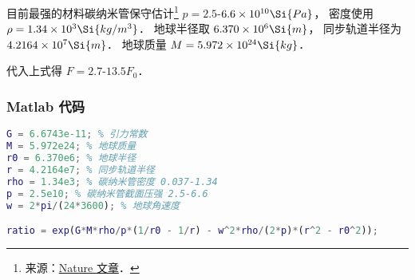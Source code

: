 目前最强的材料碳纳米管保守估计\footnote{来源：\href{https://www.nature.com/articles/s41467-019-10959-7}{Nature 文章}．} $p = 2.5$-$6.6\times 10^{10} \Si{Pa}$， 密度使用 $\rho = 1.34\times 10^{3} \Si{kg/m^3}$． 地球半径取 $6.370\times 10^6\Si{m}$， 同步轨道半径为 $4.2164\times 10^7 \Si{m}$． 地球质量 $M = 5.972 \times 10^{24} \Si{kg}$．

代入上式得 $F = 2.7$-$13.5 F_0$．

\subsubsection{Matlab 代码}
\begin{lstlisting}[language=matlab]
G = 6.6743e-11; % 引力常数
M = 5.972e24; % 地球质量
r0 = 6.370e6; % 地球半径
r = 4.2164e7; % 同步轨道半径
rho = 1.34e3; % 碳纳米管密度 0.037-1.34
p = 2.5e10; % 碳纳米管截面压强 2.5-6.6
w = 2*pi/(24*3600); % 地球角速度

ratio = exp(G*M*rho/p*(1/r0 - 1/r) - w^2*rho/(2*p)*(r^2 - r0^2));
\end{lstlisting}
